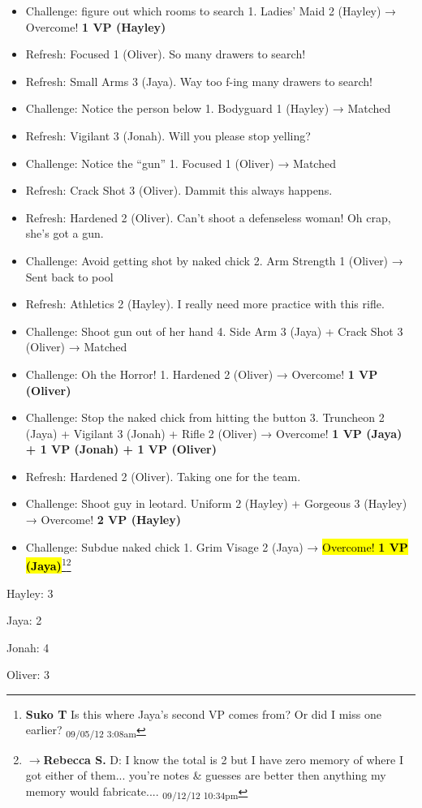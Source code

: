{\begin{itemize}
\item  Challenge: figure out which rooms to search 1. Ladies' Maid 2 (Hayley) → Overcome!  \textbf{1 VP (Hayley)}
\item Refresh: Focused 1 (Oliver).  So many drawers to search!
\item Refresh: Small Arms 3 (Jaya).  Way too f-ing many drawers to search!
\item Challenge: Notice the person below 1.  Bodyguard 1 (Hayley) → Matched
\item Refresh: Vigilant 3 (Jonah).  Will you please stop yelling?
\item Challenge: Notice the ``gun'' 1.  Focused 1 (Oliver) → Matched
\item Refresh: Crack Shot 3 (Oliver).  Dammit this always happens.
\item Refresh: Hardened 2 (Oliver).  Can't shoot a defenseless woman!  Oh crap, she's got a gun.
\item Challenge: Avoid getting shot by naked chick 2.  Arm Strength 1 (Oliver) → Sent back to pool
\item Refresh: Athletics 2 (Hayley). I really need more practice with this rifle.
\item Challenge: Shoot gun out of her hand 4.  Side Arm 3 (Jaya) + Crack Shot 3 (Oliver) → Matched
\item Challenge: Oh the Horror! 1.  Hardened 2 (Oliver) → Overcome! \textbf{1 VP (Oliver)}
\item Challenge: Stop the naked chick from hitting the button 3.  Truncheon 2 (Jaya) + Vigilant 3 (Jonah) + Rifle 2 (Oliver) → Overcome! \textbf{1 VP (Jaya) + 1 VP (Jonah) + 1 VP (Oliver)}
\item Refresh: Hardened 2 (Oliver). Taking one for the team.
\item Challenge: Shoot guy in leotard. Uniform 2 (Hayley) + Gorgeous 3 (Hayley) → Overcome! \textbf{2 VP (Hayley)}
\item Challenge: Subdue naked chick 1.  Grim Visage 2 (Jaya) → \hl{Overcome! \textbf{1 VP (Jaya)}}\footnote{\textbf{Suko T }Is this where Jaya's second VP comes from?  Or did I miss one earlier? \textsubscript{09/05/12 3:08am}}\footnote{$\rightarrow$\textbf{Rebecca S. }D:    I know the total is 2 but I have zero memory of where I got either of them... you're notes \& guesses are better then anything my memory would fabricate.... \textsubscript{09/12/12 10:34pm}}
\end{itemize}
}


{
\parskip=0pt

Hayley: 3

Jaya: 2

Jonah: 4

Oliver: 3
}


